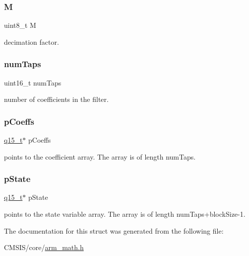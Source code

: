 \subsubsection{\texorpdfstring{M}{M}}
{\footnotesize\ttfamily uint8\+\_\+t M}

decimation factor. \mbox{\label{structarm__fir__decimate__instance__q15_a751941891e47f522a7f5375fe8990aac}} 
\subsubsection{\texorpdfstring{numTaps}{numTaps}}
{\footnotesize\ttfamily uint16\+\_\+t num\+Taps}

number of coefficients in the filter. \mbox{\label{structarm__fir__decimate__instance__q15_a7ca181a37f714d174445f486bebce26f}} 
\subsubsection{\texorpdfstring{pCoeffs}{pCoeffs}}
{\footnotesize\ttfamily \mbox{\hyperlink{arm__math_8h_ab5a8fb21a5b3b983d5f54f31614052ea}{q15\+\_\+t}}$\ast$ p\+Coeffs}

points to the coefficient array. The array is of length num\+Taps. \mbox{\label{structarm__fir__decimate__instance__q15_ae29dfdb736374fcddaeaec4b7770170c}} 
\subsubsection{\texorpdfstring{pState}{pState}}
{\footnotesize\ttfamily \mbox{\hyperlink{arm__math_8h_ab5a8fb21a5b3b983d5f54f31614052ea}{q15\+\_\+t}}$\ast$ p\+State}

points to the state variable array. The array is of length num\+Taps+block\+Size-\/1. 

The documentation for this struct was generated from the following file\+:\begin{DoxyCompactItemize}
\item 
C\+M\+S\+I\+S/core/\mbox{\hyperlink{arm__math_8h}{arm\+\_\+math.\+h}}\end{DoxyCompactItemize}
